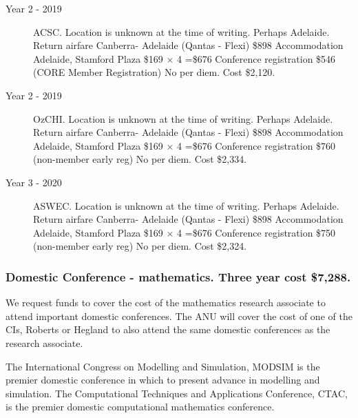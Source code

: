 \documentclass[a4paper,twoside,12pt,compact]{article}
\begin{document}
\begin{description}


\item[Year 2 - 2019] ACSC.
Location is unknown at the time of writing. Perhaps Adelaide.
Return airfare Canberra- Adelaide (Qantas - Flexi) \$898
Accommodation Adelaide, Stamford Plaza \$169 $\times$ 4 =\$676
Conference registration \$546 (CORE Member Registration)
No per diem. Cost \$2,120.

\item[Year 2 - 2019] OzCHI.
Location is unknown at the time of writing. Perhaps Adelaide.
Return airfare Canberra- Adelaide (Qantas - Flexi) \$898
Accommodation Adelaide, Stamford Plaza \$169 $\times$ 4 =\$676
Conference registration \$760 (non-member early reg)
No per diem. Cost \$2,334.

\item[Year 3 -  2020] ASWEC.
Location is unknown at the time of writing. Perhaps Adelaide.
Return airfare Canberra- Adelaide (Qantas - Flexi) \$898
Accommodation Adelaide, Stamford Plaza \$169 $\times$ 4 =\$676
Conference registration \$750 (non-member early reg)
No per diem. Cost \$2,324.


\end{description}



\subsubsection*{Domestic Conference - mathematics. Three year cost \$7,288.}

We request funds to cover the cost of the mathematics research associate to attend important domestic conferences.  The ANU will cover the cost of one of the CIs, Roberts or Hegland to also attend the same domestic conferences as the research associate. 

The International Congress on Modelling and Simulation, MODSIM is the premier domestic conference in which to present advance in modelling and simulation. 
The Computational Techniques and Applications Conference, CTAC, is the premier domestic computational mathematics conference.
\end{document}
